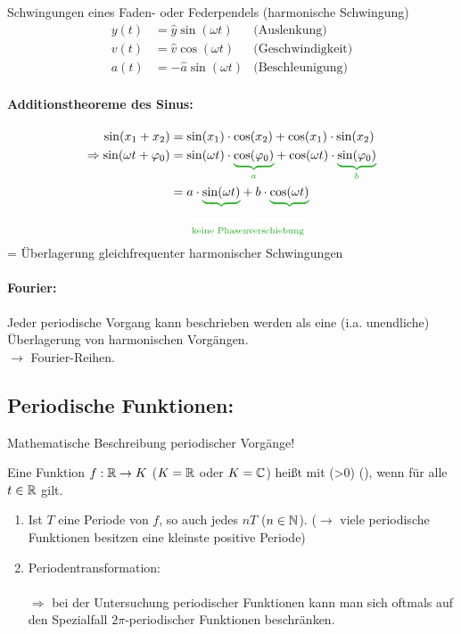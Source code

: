 
\Bsp Schwingungen eines Faden- oder Federpendels (\flqq harmonische Schwingung\frqq)
\begin{align*}
y(t)&=\hat{y}\sin(\omega t)&\text{(Auslenkung)}\\
v(t)&=\hat{v}\cos(\omega t)&\text{(Geschwindigkeit)}\\
a(t)&=-\hat{a}\sin(\omega t)&\text{(Beschleunigung)}
\end{align*}

\paragraph{Additionstheoreme des Sinus:}\quad
\begin{align*}
\sin(x_1+x_2)&=\sin(x_1)\cdot\cos(x_2)+\cos(x_1)\cdot\sin(x_2)\\
\Rightarrow\sin(\omega t+\varphi_0)&=\sin(\omega t)\cdot\greenunderbrace{\cos(\varphi_0)}{a}+\cos(\omega t)\cdot\greenunderbrace{\sin(\varphi_0)}{b}\\
&=\greenunder{a\cdot\greenunderbrace{\sin(\omega t)}{}+b\cdot\greenunderbrace{\cos(\omega t)}{}}{\text{keine Phasenverschiebung}}
\end{align*}
= \flqq Überlagerung gleichfrequenter harmonischer Schwingungen\frqq

\paragraph{Fourier:} Jeder periodische Vorgang kann beschrieben werden als eine (i.a. unendliche) Überlagerung von harmonischen Vorgängen.\\
$\rightarrow$ \flqq Fourier-Reihen\frqq.

\clearpage
\subsection{Periodische Funktionen:}
Mathematische Beschreibung periodischer Vorgänge!

\Def Eine Funktion $f:\mathbb{R}\to K$ ($K=\mathbb{R}$ oder $K=\mathbb{C}$) heißt  mit  (>0) (), wenn
für alle $t\in\mathbb{R}$ gilt.

\Bem
\begin{enumerate}
	\item Ist $T$ eine Periode von $f$, so auch jedes $nT$ ($n\in\mathbb{N}$). ($\rightarrow$ viele periodische Funktionen besitzen eine kleinste positive Periode)
	
	\item Periodentransformation:\\
	\\
	$\Rightarrow$ bei der Untersuchung periodischer Funktionen kann man sich oftmals auf den Spezialfall $2\pi$-periodischer Funktionen beschränken.
\end{enumerate}

